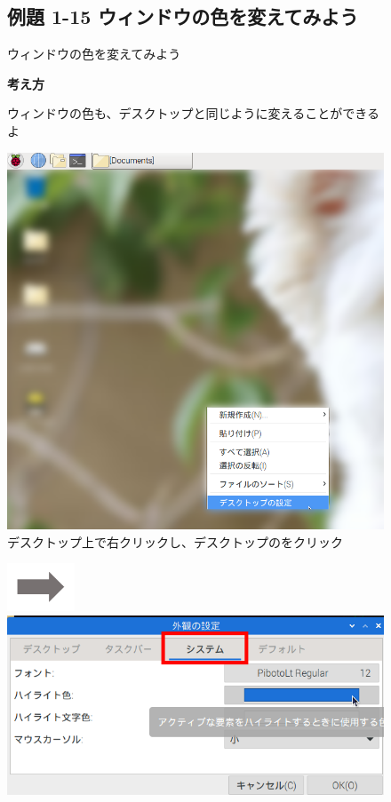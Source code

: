 \clearpage
\begin{figure}
  \subsection{例題 1-15 ウィンドウの色を変えてみよう}

  ウィンドウの色を変えてみよう
  
  \textbf{考え方}
  
  \bigskip
  \centering
  \begin{minipage}{\textwidth}
      ウィンドウの色も、デスクトップと同じように変えることができるよ
  \end{minipage}

  \begin{minipage}{0.4\textwidth}
    \includegraphics[width=\linewidth]{text01-img/textbook-img107.png}
     デスクトップ上で右クリックし、デスクトップのをクリック
  \end{minipage}
  \includegraphics[width=2cm]{text01-img/textbook-img073.png}
  \begin{minipage}{0.4\textwidth}
    \includegraphics[width=\linewidth]{text01-img/textbook-img1001.png}

\end{minipage}
\end{figure}
